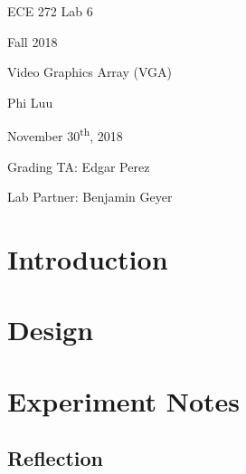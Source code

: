 \documentclass[12pt]{article}
\numberwithin{figure}{section}
\begin{document}
\begin{titlepage}
  \begin{center} \LARGE
    \vspace*{1.5in}

    ECE 272 Lab 6

    Fall 2018

    \vfill

    Video Graphics Array (VGA)

    Phi Luu

    \vfill

    November 30\textsuperscript{th}, 2018

    Grading TA: Edgar Perez

    Lab Partner: Benjamin Geyer

    \vspace{1.5in}
  \end{center}
\end{titlepage}

\section{Introduction}

\section{Design}

\section{Experiment Notes}

\subsection*{Reflection}

\end{document}
